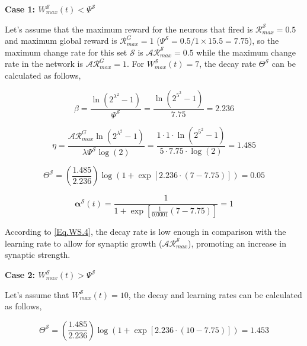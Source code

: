 \textbf{Case 1: \(W_{max}^{\mathcal{S}}(t) < \Psi^{\mathcal{S}}\)}

Let's assume that the maximum reward for the neurons that fired is \(\mathcal{R}_{max}^{\mathcal{S}} = 0.5\) and maximum global reward is \(\mathcal{R}_{max}^{G}=1\) (\(\Psi^{\mathcal{S}} = 0.5/1 \times 15.5 = 7.75\)), so the maximum change rate for this set \(\mathcal{S}\) is \(\mathcal{A}\mathcal{R}_{max}^{\mathcal{S}} = 0.5\) while the maximum change rate in the network is \(\mathcal{A}\mathcal{R}_{max}^{G} = 1\). For \(W_{max}^{\mathcal{S}}(t) = 7\), the decay rate \(\Theta^{\mathcal{S}}\) can be calculated as follows,

\begin{equation*}
    \beta = \frac{\ln{(2^{\lambda^2}-1)}}{\Psi^{\mathcal{S}}} = \frac{\ln(2^{5^2} - 1)}{7.75} = 2.236
\end{equation*}

\begin{equation*}
    \eta = \frac{\mathcal{A}\mathcal{R}_{max}^{G} \ln{(2^{\lambda^2}-1)}}{\lambda\Psi^{\mathcal{S}} \log{(2)}} = \frac{1 \cdot 1 \cdot \ln(2^{5^2} - 1)}{5 \cdot 7.75 \cdot \log(2)} = 1.485
\end{equation*}

\begin{equation*}
    \Theta^{\mathcal{S}} = \left( \frac{1.485}{2.236} \right) \log \left(1 + \exp \left[2.236 \cdot (7 - 7.75)\right] \right) = 0.05
\end{equation*}

\begin{equation*}
    \boldsymbol{\alpha}^{\mathcal{S}}(t) = \frac{1}{1 + \exp{\left[\frac{1}{0.0001}\left(7 - 7.75\right)\right]}} = 1
\end{equation*}

According to \eqref{Eq.WS.4}, the decay rate is low enough in comparison with the learning rate to allow for synaptic growth (\(\mathcal{A}\mathcal{R}_{max}^{\mathcal{S}}\)), promoting an increase in synaptic strength.

\textbf{Case 2: \(W_{max}^{\mathcal{S}}(t) > \Psi^{\mathcal{S}}\)}

Let's assume that \(W_{max}^{\mathcal{S}}(t) = 10\), the decay and learning rates can be calculated as follows,

\begin{equation*}
    \Theta^{\mathcal{S}} = \left( \frac{1.485}{2.236} \right) \log \left(1 + \exp \left[2.236 \cdot (10 - 7.75)\right] \right) = 1.453
\end{equation*}

